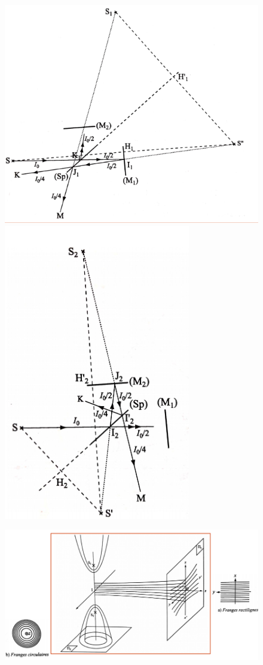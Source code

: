 \documentclass[10pt]{beamer}
\begin{document}
\begin{frame}{\insertsubsection}
    \begin{figure}
        \centering
        \includegraphics[width=.45\textwidth]{M91.png}\includegraphics[width=.45\textwidth]{M92.png}
    \end{figure}
\end{frame}

\begin{frame}{\insertsubsection}
    \begin{figure}
        \centering
        \includegraphics[width=1\textwidth]{M10.png}
    \end{figure}
\end{frame}
\end{document}
